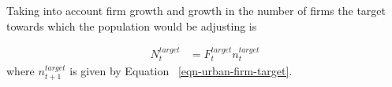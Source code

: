 





Taking into account firm growth and growth in the number of firms the target towards which the population would be adjusting  is 

 \begin{align}
N_t^{target}&=F_t^{target}n_t^{target}
\end{align} 
where $n^{target}_{t+1}$ is given by Equation ~\ref{eqn-urban-firm-target}.  

